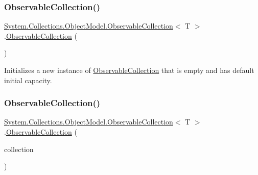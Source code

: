 \subsubsection{\texorpdfstring{Observable\+Collection()}{ObservableCollection()}\hspace{0.1cm}{\footnotesize\ttfamily [1/2]}}
{\footnotesize\ttfamily \hyperlink{class_system_1_1_collections_1_1_object_model_1_1_observable_collection}{System.\+Collections.\+Object\+Model.\+Observable\+Collection}$<$ T $>$.\hyperlink{class_system_1_1_collections_1_1_object_model_1_1_observable_collection}{Observable\+Collection} (\begin{DoxyParamCaption}{ }\end{DoxyParamCaption})\hspace{0.3cm}{\ttfamily [inline]}}



Initializes a new instance of \hyperlink{class_system_1_1_collections_1_1_object_model_1_1_observable_collection}{Observable\+Collection} that is empty and has default initial capacity. 

\mbox{\label{class_system_1_1_collections_1_1_object_model_1_1_observable_collection_a899061b5cae416da03e015f44966f1ad}} 
\subsubsection{\texorpdfstring{Observable\+Collection()}{ObservableCollection()}\hspace{0.1cm}{\footnotesize\ttfamily [2/2]}}
{\footnotesize\ttfamily \hyperlink{class_system_1_1_collections_1_1_object_model_1_1_observable_collection}{System.\+Collections.\+Object\+Model.\+Observable\+Collection}$<$ T $>$.\hyperlink{class_system_1_1_collections_1_1_object_model_1_1_observable_collection}{Observable\+Collection} (\begin{DoxyParamCaption}\item[{I\+Enumerable$<$ T $>$}]{collection }\end{DoxyParamCaption})\hspace{0.3cm}{\ttfamily [inline]}}



